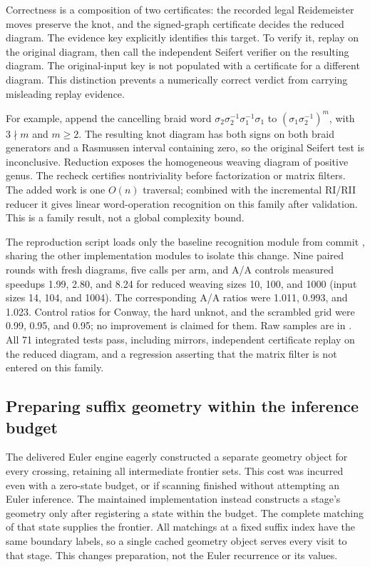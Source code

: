 Correctness is a composition of two certificates: the recorded legal
Reidemeister moves preserve the knot, and the signed-graph certificate
decides the reduced diagram. The evidence key
 explicitly identifies this target.
To verify it, replay  on the original diagram,
then call the independent Seifert verifier on the resulting diagram.
The original-input key  is not populated with
a certificate for a different diagram. This distinction prevents a
numerically correct verdict from carrying misleading replay evidence.

For example, append the cancelling braid word
$\sigma_2\sigma_2^{-1}\sigma_1^{-1}\sigma_1$ to
$(\sigma_1\sigma_2^{-1})^m$, with $3\nmid m$ and $m\ge2$. The resulting
knot diagram has both signs on both braid generators and a Rasmussen
interval containing zero, so the original Seifert test is inconclusive.
Reduction exposes the homogeneous weaving diagram of positive genus.
The recheck certifies nontriviality before factorization or matrix filters.
The added work is one $O(n)$ traversal; combined with the incremental
RI/RII reducer it gives linear word-operation recognition on this family
after validation. This is a family result, not a global complexity bound.

The reproduction script  loads only
the baseline recognition module from commit , sharing
the other implementation modules to isolate this change. Nine paired
rounds with fresh diagrams, five calls per arm, and A/A controls measured
speedups 1.99, 2.80, and 8.24 for reduced weaving sizes 10, 100, and 1000
(input sizes 14, 104, and 1004). The corresponding A/A ratios were
1.011, 0.993, and 1.023. Control ratios for Conway, the hard unknot, and
the scrambled grid were 0.99, 0.95, and 0.95; no improvement is claimed
for them. Raw samples are in
.
All 71 integrated tests pass, including mirrors, independent certificate
replay on the reduced diagram, and a regression asserting that the
matrix filter is not entered on this family.

\subsection{Preparing suffix geometry within the inference budget}
The delivered Euler engine eagerly constructed a separate geometry object
for every crossing, retaining all intermediate frontier sets. This cost
was incurred even with a zero-state budget, or if scanning finished
without attempting an Euler inference. The maintained implementation
instead constructs a stage's geometry only after registering a state
within the budget. The complete matching of that state supplies the
frontier. All matchings at a fixed suffix index have the same boundary
labels, so a single cached geometry object serves every visit to that
stage. This changes preparation, not the Euler recurrence or its values.

